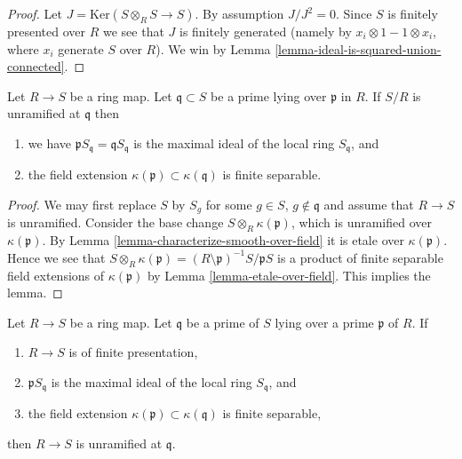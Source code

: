 \begin{proof}
Let $J = \text{Ker}(S \otimes_R S \to S)$. By assumption
$J/J^2 = 0$. Since $S$ is finitely presented over $R$ we
see that $J$ is finitely generated (namely by
$x_i \otimes 1 - 1 \otimes x_i$, where $x_i$ generate $S$ over $R$).
We win by Lemma \ref{lemma-ideal-is-squared-union-connected}.
\end{proof}

\begin{lemma}
\label{lemma-unramified-at-prime}
Let $R \to S$ be a ring map.
Let $\mathfrak q \subset S$ be
a prime lying over $\mathfrak p$ in $R$.
If $S/R$ is unramified at $\mathfrak q$ then
\begin{enumerate}
\item we have $\mathfrak p S_{\mathfrak q} = \mathfrak qS_{\mathfrak q}$
is the maximal ideal of the local ring $S_{\mathfrak q}$, and
\item the field extension $\kappa(\mathfrak p) \subset \kappa(\mathfrak q)$
is finite separable.
\end{enumerate}
\end{lemma}

\begin{proof}
We may first replace $S$ by $S_g$ for some $g \in S$, $g \not \in \mathfrak q$
and assume that $R \to S$ is unramified.
Consider the base change $S \otimes_R \kappa(\mathfrak p)$, which
is unramified over $\kappa(\mathfrak p)$.
By Lemma \ref{lemma-characterize-smooth-over-field} it is etale
over $\kappa(\mathfrak p)$.
Hence we see that
$S \otimes_R \kappa(\mathfrak p)
= (R \setminus \mathfrak p)^{-1} S/\mathfrak pS$
is a product of finite separable field extensions of
$\kappa(\mathfrak p)$ by Lemma \ref{lemma-etale-over-field}.
This implies the lemma.
\end{proof}

\begin{lemma}
\label{lemma-characterize-unramified}
Let $R \to S$ be a ring map. Let $\mathfrak q$ be a prime of $S$
lying over a prime $\mathfrak p$ of $R$. If
\begin{enumerate}
\item $R \to S$ is of finite presentation,
\item $\mathfrak p S_{\mathfrak q}$ is the maximal ideal
of the local ring $S_{\mathfrak q}$, and
\item the field extension $\kappa(\mathfrak p) \subset \kappa(\mathfrak q)$
is finite separable,
\end{enumerate}
then $R \to S$ is unramified at $\mathfrak q$.
\end{lemma}

